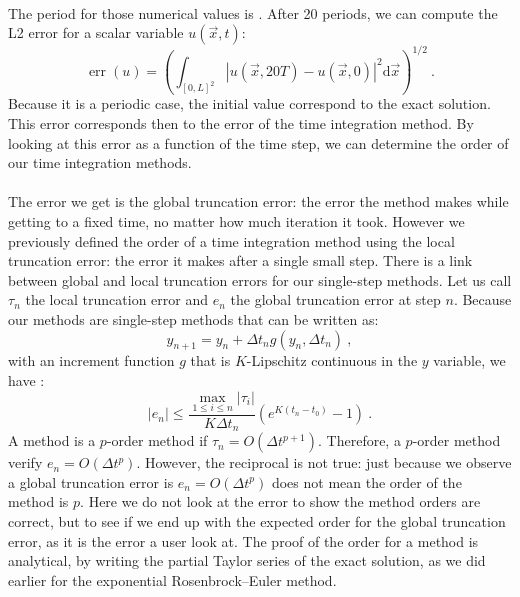       \paragraph{}
      The period for those numerical values is .
      After 20 periods, we can compute the L2 error for a scalar variable $u\left(\vec{x}, t\right)$:
      \begin{equation}
        \operatorname{err}\left(u\right) = \left(\int_{\left[0, L\right]^2} \left|u\left(\vec{x}, 20T\right) - u\left(\vec{x}, 0\right)\right|^2 \mathrm{d}\vec{x} \right)^{1/2} \ .
      \end{equation}
      Because it is a periodic case, the initial value correspond to the exact solution.
      This error corresponds then to the error of the time integration method.
      By looking at this error as a function of the time step, we can determine the order of our time integration methods.

      \paragraph{}
      The error we get is the global truncation error: the error the method makes while getting to a fixed time, no matter how much iteration it took.
      However we previously defined the order of a time integration method using the local truncation error: the error it makes after a single small step.
      There is a link between global and local truncation errors for our single-step methods.
      Let us call $\tau_n$ the local truncation error and $e_n$ the global truncation error at step $n$.
      Because our methods are single-step methods that can be written as:
      \begin{equation}
        y_{n+1} = y_n + \Delta t_n g\left(y_n, \Delta t_n\right) \ ,
      \end{equation}
      with an increment function $g$ that is $K$-Lipschitz continuous in the $y$ variable, we have \cite{SueliMayers2003}:
      \begin{equation}
        \left| e_n \right| \leq \frac{\max_{1 \leq i \leq n} \left| \tau_i \right|}{K \Delta t_n} \left(e^{K\left(t_n - t_0\right)} - 1\right) \ .
      \end{equation}
      A method is a $p$-order method if $\tau_n = O\left(\Delta t^{p+1}\right)$.
      Therefore, a $p$-order method verify $e_n = O\left(\Delta t^{p}\right)$.
      However, the reciprocal is not true: just because we observe a global truncation error is $e_n = O\left(\Delta t^{p}\right)$ does not mean the order of the method is $p$.
      Here we do not look at the error to show the method orders are correct, but to see if we end up with the expected order for the global truncation error, as it is the error a user look at.
      The proof of the order for a method is analytical, by writing the partial Taylor series of the exact solution, as we did earlier for the exponential Rosenbrock--Euler method.

